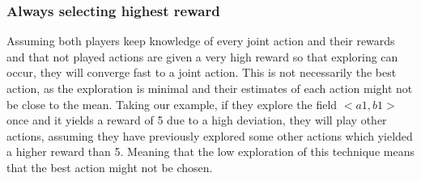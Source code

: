 \documentclass[a4paper, 11pt]{article}
\begin{document}
\subsubsection{Always selecting highest reward}
Assuming both players keep knowledge of every joint action and their rewards and that not played actions are given a very high reward so that exploring can occur, they will converge fast to a joint action. This is not necessarily the best action, as the exploration is minimal and their estimates of each action might not be close to the mean. Taking our example, if they explore the field $<a1,b1>$ once and it yields a reward of 5 due to a high deviation, they will play other actions, assuming they have previously explored some other actions which yielded a higher reward than 5. Meaning that the low exploration of this technique means that the best action might not be chosen.
 


\newpage



\end{document}
